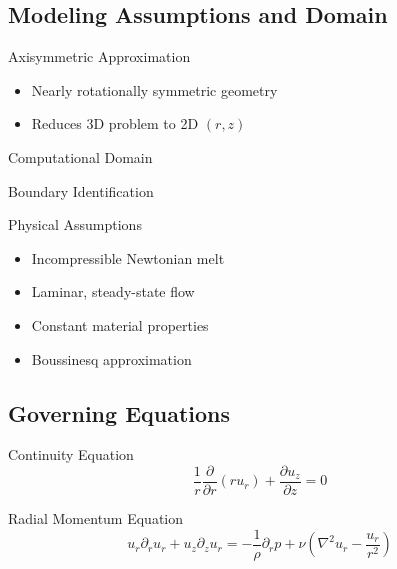 \documentclass{beamer}
\begin{document}
\subsection{Modeling Assumptions and Domain}

\begin{frame}{Axisymmetric Approximation}
\begin{itemize}
\item Nearly rotationally symmetric geometry
\item Reduces 3D problem to 2D $(r,z)$
\end{itemize}
\end{frame}

\begin{frame}{Computational Domain}
\end{frame}

\begin{frame}{Boundary Identification}
\end{frame}

\begin{frame}{Physical Assumptions}
\begin{itemize}
\item Incompressible Newtonian melt
\item Laminar, steady-state flow
\item Constant material properties
\item Boussinesq approximation
\end{itemize}
\end{frame}

\subsection{Governing Equations}

\begin{frame}{Continuity Equation}
\[
\frac{1}{r}\frac{\partial}{\partial r}(r u_r)
+ \frac{\partial u_z}{\partial z} = 0
\]
\end{frame}

\begin{frame}{Radial Momentum Equation}
\[
u_r \partial_r u_r + u_z \partial_z u_r =
-\frac{1}{\rho}\partial_r p
+ \nu\left(\nabla^2 u_r - \frac{u_r}{r^2}\right)
\]
\end{frame}
\end{document}
